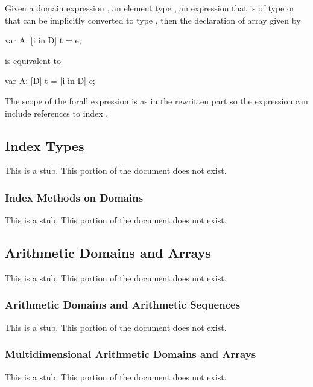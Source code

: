 Given a domain expression , an element type , an
expression  that is of type  or that can be implicitly
converted to type , then the declaration of array 
given by
\begin{chapel}
var A: [i in D] t = e;
\end{chapel}
is equivalent to
\begin{chapel}
var A: [D] t = [i in D] e;
\end{chapel}
The scope of the forall expression is as in the rewritten part so the
expression  can include references to index .

\subsection{Index Types}
\label{Index_Types}

This is a stub.  This portion of the document does not exist.

\subsubsection{Index Methods on Domains}
\label{Index_Methods_on_Domains}

This is a stub.  This portion of the document does not exist.

\subsection{Arithmetic Domains and Arrays}
\label{Arithmetic_Domains_and_Arrays}

This is a stub.  This portion of the document does not exist.

\subsubsection{Arithmetic Domains and Arithmetic Sequences}
\label{Arithmetic_Domains_and_Arithmetic_Sequences}

This is a stub.  This portion of the document does not exist.

\subsubsection{Multidimensional Arithmetic Domains and Arrays}
\label{Multidimensional_Arithmetic_Domains_and_Arrays}

This is a stub.  This portion of the document does not exist.

